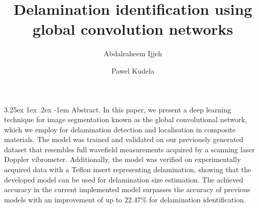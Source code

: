 \documentclass[runningheads]{llncs}
\makeatletter
\renewcommand\paragraph{\@startsection{paragraph}{4}{\z@}%
                                    {3.25ex \@plus1ex \@minus.2ex}%
                                    {-1em}%
                                    {\normalfont\normalsize\bfseries}}
\makeatother
\begin{document}
%
\title{Delamination identification using global convolution networks}
%
%
\author{Abdalraheem Ijjeh \and
Pawel Kudela}
%
%
%
\maketitle              %
%
\paragraph{Abstract.}
In this paper, we present a deep learning technique for image segmentation known as the global convolutional network, which we employ for delamination detection and localisation in composite materials.
The model was trained and validated on our previously generated dataset that resembles full wavefield measurements acquired by a scanning laser Doppler vibrometer.
Additionally, the model was verified on experimentally acquired data with a Teflon insert representing delamination, showing that the developed model can be used for delamination size estimation.
The achieved accuracy in the current implemented model surpasses the accuracy of previous models with an improvement of up to $22.47\%$ for delamination identification.


%
\\[2em]

\end{document}
